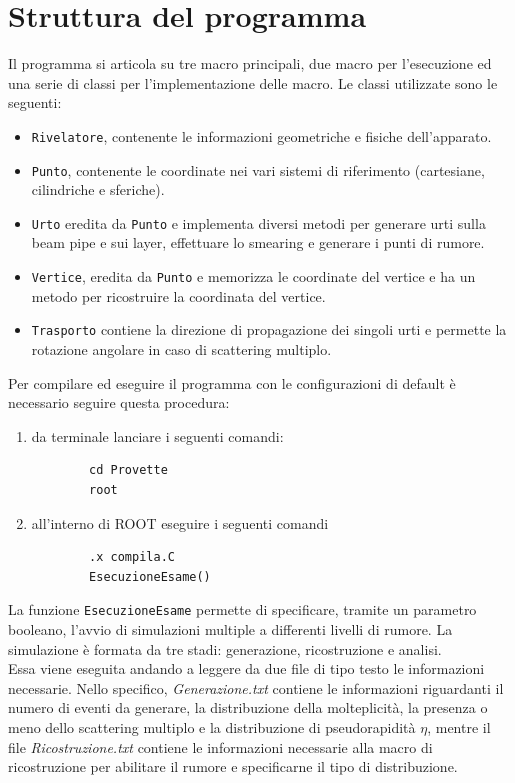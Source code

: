 \documentclass[11pt,a4paper]{article}
\begin{document}
\section{Struttura del programma}
\par Il programma si articola su tre macro principali, due macro per l'esecuzione ed una serie di classi per l'implementazione delle macro. Le classi utilizzate sono le seguenti:
\begin{itemize}
\item \lstinline{Rivelatore}, contenente le informazioni geometriche e fisiche dell'apparato.
\item \lstinline{Punto}, contenente le coordinate nei vari sistemi di riferimento (cartesiane, cilindriche e sferiche).
\item \lstinline{Urto} eredita da \lstinline{Punto} e implementa diversi metodi per generare urti sulla beam pipe e sui layer, effettuare lo smearing e generare i punti di rumore.
\item \lstinline{Vertice}, eredita da \lstinline{Punto} e memorizza le coordinate del vertice e ha un metodo per ricostruire la coordinata del vertice.
\item \lstinline{Trasporto} contiene la direzione di propagazione dei singoli urti e permette la rotazione angolare in caso di scattering multiplo.
\end{itemize}
Per compilare ed eseguire il programma con le configurazioni di default è necessario seguire questa procedura:
\begin{enumerate}
    \item da terminale lanciare i seguenti comandi:
    \begin{lstlisting}
        cd Provette
        root
    \end{lstlisting}
    \item all'interno di ROOT eseguire i seguenti comandi
    \begin{lstlisting}
        .x compila.C
        EsecuzioneEsame()
    \end{lstlisting}
\end{enumerate}
La funzione \lstinline{EsecuzioneEsame} permette di specificare, tramite un parametro booleano, l'avvio di simulazioni multiple a differenti livelli di rumore. La simulazione è formata da tre stadi: generazione, ricostruzione e analisi.\\
Essa viene eseguita andando a leggere da due file di tipo testo le informazioni necessarie. Nello specifico, \textit{Generazione.txt} contiene le informazioni riguardanti il numero di eventi da generare, la distribuzione della molteplicità, la presenza o meno dello scattering multiplo e la distribuzione di pseudorapidità $\eta$, mentre il file \textit{Ricostruzione.txt} contiene le informazioni necessarie alla macro di ricostruzione per abilitare il rumore e specificarne il tipo di distribuzione.\\
\end{document}
